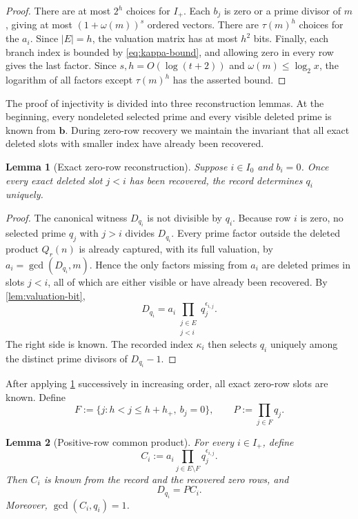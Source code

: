 \documentclass[11pt]{amsart}
\newtheorem{lemma}[lemma]{Lemma}
\theoremstyle{definition}
\theoremstyle{remark}
\numberwithin{equation}{section}
\begin{document}
\begin{proof}
There are at most $2^h$ choices for $I_+$.  Each $b_j$ is zero or a
prime divisor of $m$, giving at most $(1+\omega(m))^s$ ordered vectors.
There are $\tau(m)^h$ choices for the $a_i$.  Since $|E|=h$, the
valuation matrix has at most $h^2$ bits.  Finally, each branch index is
bounded by \eqref{eq:kappa-bound}, and allowing zero in every row gives
the last factor.  Since $s,h=O(\log(t+2))$ and
$\omega(m)\le\log_2x$, the logarithm of all factors except
$\tau(m)^h$ has the asserted bound.
\end{proof}

The proof of injectivity is divided into three reconstruction lemmas.
At the beginning, every nondeleted selected prime and every visible
deleted prime is known from $\mathbf b$.  During zero-row recovery we
maintain the invariant that all exact deleted slots with smaller index
have already been recovered.

\begin{lemma}[Exact zero-row reconstruction]\label{lem:zero-row-recovery}
Suppose $i\in I_0$ and $b_i=0$.  Once every exact deleted slot $j<i$
has been recovered, the record determines $q_i$ uniquely.
\end{lemma}

\begin{proof}
The canonical witness $D_{q_i}$ is not divisible by $q_i$.  Because row
$i$ is zero, no selected prime $q_j$ with $j>i$ divides $D_{q_i}$.
Every prime factor outside the deleted product $Q_r(n)$ is already
captured, with its full valuation, by $a_i=\gcd(D_{q_i},m)$.  Hence the
only factors missing from $a_i$ are deleted primes in slots $j<i$, all
of which are either visible or have already been recovered.  By
\cref{lem:valuation-bit},
\begin{equation}\label{eq:zero-row-reconstruction-formula}
 D_{q_i}=a_i\prod_{\substack{j\in E\\j<i}}
 q_j^{\epsilon_{i,j}}.
\end{equation}
The right side is known.  The recorded index $\kappa_i$ then selects
$q_i$ uniquely among the distinct prime divisors of $D_{q_i}-1$.
\end{proof}

After applying \cref{lem:zero-row-recovery} successively in increasing
order, all exact zero-row slots are known.  Define
\[
 F:=\{j:h<j\le h+h_+,\ b_j=0\},
 \qquad P:=\prod_{j\in F}q_j.
\]

\begin{lemma}[Positive-row common product]\label{lem:positive-common-product}
For every $i\in I_+$, define
\begin{equation}\label{eq:positive-row-Ci}
 C_i:=a_i\prod_{j\in E\setminus F}q_j^{\epsilon_{i,j}}.
\end{equation}
Then $C_i$ is known from the record and the recovered zero rows, and
\begin{equation}\label{eq:positive-row-DPCi}
 D_{q_i}=P C_i.
\end{equation}
Moreover, $\gcd(C_i,q_i)=1$.
\end{lemma}
\end{document}
